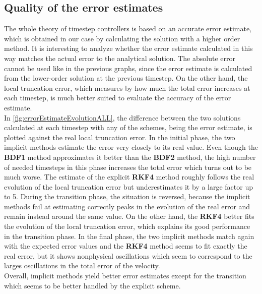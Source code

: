 \subsection{Quality of the error estimates}
\label{ssec:QualityErrorEstimate_0D}
The whole theory of timestep controllers is based on an accurate error estimate, which is obtained in our case by calculating the solution with a higher order method. It is interesting to analyze whether the error estimate calculated in this way matches the actual error to the analytical solution. The absolute error cannot be used like in the previous graphs, since the error estimate is calculated from the lower-order solution at the previous timestep. On the other hand, the local truncation error, which measures by how much the total error increases at each timestep, is much better suited to evaluate the accuracy of the error estimate. \\
In \autoref{fig:errorEstimateEvolutionALL}, the difference between the two solutions calculated at each timestep with any of the schemes, being the error estimate, is plotted against the real local truncation error. In the initial phase, the two implicit methods estimate the error very closely to its real value. Even though the \textbf{BDF1} method approximates it better than the \textbf{BDF2} method, the high number of needed timesteps in this phase increases the total error which turns out to be much worse. The estimate of the explicit \textbf{RKF4} method roughly follows the real evolution of the local truncation error but underestimates it by a large factor up to 5. During the transition phase, the situation is reversed, because the implicit methods fail at estimating correctly peaks in the evolution of the real error and remain instead around the same value. On the other hand, the \textbf{RKF4} better fits the evolution of the local truncation error, which explains its good performance in the transition phase. In the final phase, the two implicit methods match again with the expected error values and the \textbf{RKF4} method seems to fit exactly the real error, but it shows nonphysical oscillations which seem to correspond to the larges oscillations in the total error of the velocity. \\
Overall, implicit methods yield better error estimates except for the transition which seems to be better handled by the explicit scheme. 

